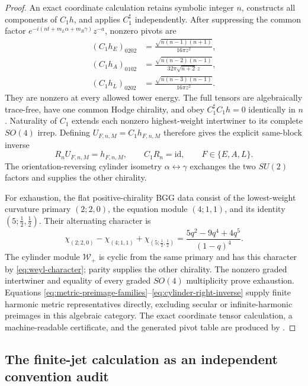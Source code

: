 \documentclass[11pt]{article}
\theoremstyle{definition}
\theoremstyle{remark}
\newcommand{\W}{\mathcal W}
\newcommand{\id}{\mathrm{id}}
\begin{document}
\begin{proof}
An exact coordinate calculation retains symbolic integer $n$, constructs
all components of $C_1h$, and applies $C_1^\sharp$ independently.  After
suppressing the common factor
$e^{-i(n t+m_L\alpha+m_R\gamma)}z^{-a}$, nonzero pivots are
\begin{align}
 (C_1h_E)_{0202}
 &=\frac{\sqrt{n(n-1)(n+1)}}{16\pi z^2},\nonumber\\
 (C_1h_A)_{0102}
 &=\frac{\sqrt{n(n-2)(n-1)}}{32\pi\sqrt{n+2}\,z},
 \label{eq:curvature-pivots}\\
 (C_1h_L)_{0202}
 &=\frac{\sqrt{n(n-3)(n-1)}}{16\pi z^2}.\nonumber
\end{align}
They are nonzero at every allowed tower energy.  The full tensors are
algebraically trace-free, have one common Hodge chirality, and obey
$C_1^\sharp C_1h=0$ identically in $n$.  Naturality of $C_1$ extends each
nonzero highest-weight intertwiner to its complete $SO(4)$ irrep.  Defining
$U_{F,n,M}=C_1h_{F,n,M}$ therefore gives the explicit same-block inverse
\begin{equation}\label{eq:cylinder-right-inverse}
 R_nU_{F,n,M}=h_{F,n,M},\qquad C_1R_n=\id,
 \qquad F\in\{E,A,L\}.
\end{equation}
The orientation-reversing cylinder isometry $\alpha\leftrightarrow\gamma$
exchanges the two $SU(2)$ factors and supplies the other chirality.

For exhaustion, the flat positive-chirality BGG data consist of the
lowest-weight curvature primary $(2;2,0)$, the equation module $(4;1,1)$,
and its identity $(5;\tfrac12,\tfrac12)$.  Their alternating character is
\begin{equation}
 \chi_{(2;2,0)}-\chi_{(4;1,1)}
 +\chi_{(5;\frac12,\frac12)}
 =\frac{5q^2-9q^4+4q^5}{(1-q)^4}.
\end{equation}
The cylinder module $\W_+$ is cyclic from the same primary and has this
character by \eqref{eq:weyl-character}; parity supplies the other chirality.
The nonzero graded intertwiner and equality of every graded $SO(4)$
multiplicity prove exhaustion.  Equations
\eqref{eq:metric-preimage-families}--\eqref{eq:cylinder-right-inverse}
supply finite harmonic metric representatives directly, excluding secular
or infinite-harmonic preimages in this algebraic category.
The exact coordinate tensor calculation, a machine-readable certificate,
and the generated pivot table are produced by
.
\end{proof}

\subsection{The finite-jet calculation as an independent convention audit}
\end{document}
